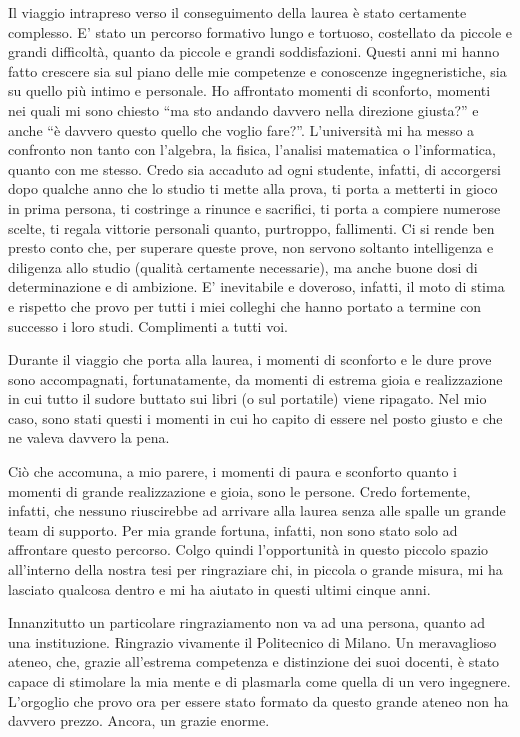 
Il viaggio intrapreso verso il conseguimento della laurea è stato certamente complesso. E' stato un percorso formativo lungo e tortuoso, costellato da piccole e grandi difficoltà, quanto da piccole e grandi soddisfazioni. Questi anni mi hanno fatto crescere sia sul piano delle mie competenze e conoscenze ingegneristiche, sia su quello più intimo e personale. Ho affrontato momenti di sconforto, momenti nei quali mi sono chiesto ``ma sto andando davvero nella direzione giusta?'' e anche ``è davvero questo quello che voglio fare?''. L'università mi ha messo a confronto non tanto con l'algebra, la fisica, l'analisi matematica o l'informatica, quanto con me stesso. Credo sia accaduto ad ogni studente, infatti, di accorgersi dopo qualche anno che lo studio ti mette alla prova, ti porta a metterti in gioco in prima persona, ti costringe a rinunce e sacrifici, ti porta a compiere numerose scelte, ti regala vittorie personali quanto, purtroppo, fallimenti. Ci si rende ben presto conto che, per superare queste prove, non servono soltanto intelligenza e diligenza allo studio (qualità certamente necessarie), ma anche buone dosi di determinazione e di ambizione. E' inevitabile e doveroso, infatti, il moto di stima e rispetto che provo per tutti i miei colleghi che hanno portato a termine con successo i loro studi. Complimenti a tutti voi.  

Durante il viaggio che porta alla laurea, i momenti di sconforto e le dure prove sono accompagnati, fortunatamente, da momenti di estrema gioia e realizzazione in cui tutto il sudore buttato sui libri (o sul portatile) viene ripagato. Nel mio caso, sono stati questi i momenti in cui ho capito di essere nel posto giusto e che ne valeva davvero la pena.

Ciò che accomuna, a mio parere, i momenti di paura e sconforto quanto i momenti di grande realizzazione e gioia, sono le persone. Credo fortemente, infatti, che nessuno riuscirebbe ad arrivare alla laurea senza alle spalle un grande team di supporto. Per mia grande fortuna, infatti, non sono stato solo ad affrontare questo percorso. Colgo quindi l'opportunità in questo piccolo spazio all'interno della nostra tesi per ringraziare chi, in piccola o grande misura, mi ha lasciato qualcosa dentro e mi ha aiutato in questi ultimi cinque anni.

Innanzitutto un particolare ringraziamento non va ad una persona, quanto ad una instituzione. Ringrazio vivamente il Politecnico di Milano. Un meravaglioso ateneo, che, grazie all'estrema competenza e distinzione dei suoi docenti, è stato capace di stimolare la mia mente e di plasmarla come quella di un vero ingegnere. L'orgoglio che provo ora per essere stato formato da questo grande ateneo non ha davvero prezzo. Ancora, un grazie enorme.

